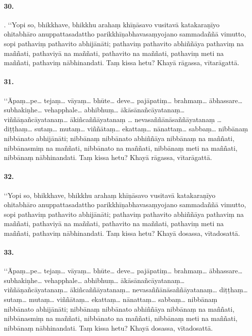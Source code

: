 
\paragraph{30.} . ‘‘Yopi so, bhikkhave, bhikkhu arahaṃ khīṇāsavo vusitavā katakaraṇīyo ohitabhāro anuppattasadattho parikkhīṇabhavasaṃyojano sammadaññā vimutto, sopi pathaviṃ pathavito abhijānāti; pathaviṃ pathavito abhiññāya pathaviṃ na maññati, pathaviyā na maññati, pathavito na maññati, pathaviṃ meti na maññati, pathaviṃ nābhinandati. Taṃ kissa hetu? Khayā rāgassa, vītarāgattā.

\paragraph{31.} ‘‘Āpaṃ…pe… tejaṃ… vāyaṃ… bhūte… deve… pajāpatiṃ… brahmaṃ… ābhassare… subhakiṇhe… vehapphale… abhibhuṃ… ākāsānañcāyatanaṃ… viññāṇañcāyatanaṃ… ākiñcaññāyatanaṃ … nevasaññānāsaññāyatanaṃ … diṭṭhaṃ… sutaṃ… mutaṃ… viññātaṃ… ekattaṃ… nānattaṃ… sabbaṃ… nibbānaṃ nibbānato abhijānāti; nibbānaṃ nibbānato abhiññāya nibbānaṃ na maññati, nibbānasmiṃ na maññati, nibbānato na maññati, nibbānaṃ meti na maññati, nibbānaṃ nābhinandati. Taṃ kissa hetu? Khayā rāgassa, vītarāgattā.


\paragraph{32.} ‘‘Yopi so, bhikkhave, bhikkhu arahaṃ khīṇāsavo vusitavā katakaraṇīyo ohitabhāro anuppattasadattho parikkhīṇabhavasaṃyojano sammadaññā vimutto, sopi pathaviṃ pathavito abhijānāti; pathaviṃ pathavito abhiññāya pathaviṃ na maññati, pathaviyā na maññati, pathavito na maññati, pathaviṃ meti na maññati, pathaviṃ nābhinandati. Taṃ kissa hetu? Khayā dosassa, vītadosattā.

\paragraph{33.} ‘‘Āpaṃ…pe… tejaṃ… vāyaṃ… bhūte… deve… pajāpatiṃ… brahmaṃ… ābhassare… subhakiṇhe… vehapphale… abhibhuṃ… ākāsānañcāyatanaṃ… viññāṇañcāyatanaṃ… ākiñcaññāyatanaṃ… nevasaññānāsaññāyatanaṃ… diṭṭhaṃ… sutaṃ… mutaṃ… viññātaṃ… ekattaṃ… nānattaṃ… sabbaṃ… nibbānaṃ nibbānato abhijānāti; nibbānaṃ nibbānato abhiññāya nibbānaṃ na maññati, nibbānasmiṃ na maññati, nibbānato na maññati, nibbānaṃ meti na maññati, nibbānaṃ nābhinandati. Taṃ kissa hetu? Khayā dosassa, vītadosattā.

